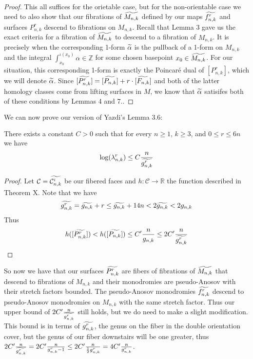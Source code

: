\begin{proof}
    This all suffices for the orietable case, but for the non-orientable case we need to also show that our fibrations of $\widetilde{M_{n,k}}$ defined by our maps $\widetilde{f^r_{n,k}}$ and surfaces $P^r_{n,k}$ descend to fibrations on $M_{n,k}$. Recall that Lemma 3 gave us the exact criteria for a fibration of $\widetilde{M_{n,k}}$ to descend to a fibration of $M_{n,k}$. It is precisely when the corresponding 1-form $\widetilde{\alpha}$ is the pullback of a 1-form on $M_{n,k}$ and the integral $\int_{x_0}^{\iota(x_0)} \alpha \in \mathbb{Z}$ for some chosen basepoint $x_0 \in \widetilde{M_{n,k}}$. For our situation, this corresponding 1-form is exactly the Poincar\'e dual of $[P^r_{n,k}]$, which we will denote $\widetilde{\alpha}$. Since $[\widetilde{P^r_{n,k}}] = [\widetilde{P_{n,k}}] + r\cdot[\widetilde{F_{n,k}}]$ and both of the latter homology classes come from lifting surfaces in $M$, we know that $\widetilde{\alpha}$ satisifes both of these conditions by Lemmas 4 and 7.. 
\end{proof}

We can now prove our version of Yazdi's Lemma 3.6:

\begin{lem}
There exists a constant $C > 0$ such that for every $n \geq 1$, $k \geq 3$, and $0 \leq r \leq 6n$ we have $$\log(\lambda^r_{n,k}) \leq C\frac{n}{\widetilde{g^r_{n,k}}}$$
\end{lem}
\begin{proof}
    Let $\mathcal{C} = \widetilde{\mathcal{C}^i_{n,k}}$ be our fibered faces and $h: \mathcal{C} \xrightarrow[]{} \mathbb{R}$ the function described in Theorem X. Note that we have 
    $$\widetilde{g^r_{n,k}} = \widetilde{g_{n,k}} + r \leq \widetilde{g_{n,k}} + 14n < 2\widetilde{g_{n,k}} < 2g_{n,k}$$
    Thus
    $$h([\widetilde{P^r_{n,k}}]) < h([\widetilde{P_{n,k}}]) \leq C'\frac{n}{g_{n,k}} \leq 2C'\frac{n}{\widetilde{g^r_{n,k}}} $$
\end{proof}

So now we have that our surfaces $\widetilde{P^r_{n,k}}$ are fibers of fibrations of $\widetilde{M_{n,k}}$ that descend to fibrations of $M_{n,k}$ and their monodromies are pseudo-Anosov with their stretch factors bounded. The pseudo-Anosov monodromies $\widetilde{f^r_{n,k}}$ descend to pseudo-Anosov monodromies on $M_{n,k}$ with the same stretch factor. Thus our upper bound of $2C'\frac{n}{\widetilde{g^{r}_{n,k}}}$ still holds, but we do need to make a slight modification. This bound is in terms of $\widetilde{g^r_{n,k}}$, the genus on the fiber in the double orientation cover, but the genus of our fiber downstairs will be one greater, thus $2C'\frac{n}{\widetilde{g^r_{n,k}}} = 2C'\frac{n}{g^r_{n,k} - 1} \leq 2C'\frac{n}{\frac{1}{2}g^r_{n,k}} = 4C'\frac{n}{g^r_{n,k}}$.


